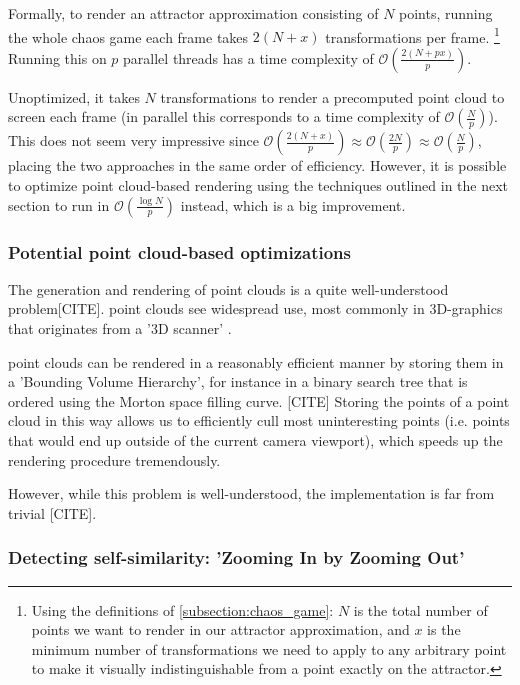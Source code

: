 \documentclass[11pt]{article}
\begin{document}
Formally, to render an attractor approximation consisting of \(N\) points, 
running the whole chaos game each frame takes \(2(N+x)\) transformations per frame. \footnote{Using the definitions of \autoref{subsection:chaos_game}: \(N\) is the total number of points we want to render in our attractor approximation, 
and \(x\) is the minimum number of transformations we need to apply to any arbitrary point to make it visually indistinguishable from a point exactly on the attractor.} 
Running this on \(p\) parallel threads has a time complexity of \(\mathcal{O}(\frac{2(N+px)}{p})\).

Unoptimized, it takes \(N\) transformations to render a precomputed point cloud to screen each frame (in parallel this corresponds to a time complexity of \(\mathcal{O}(\frac{N}{p})\)).
This does not seem very impressive since \(\mathcal{O}(\frac{2(N+x)}{p}) \approx \mathcal{O}(\frac{2N}{p}) \approx \mathcal{O}(\frac{N}{p})\),
placing the two approaches in the same order of efficiency. However, it is possible to optimize point cloud-based rendering using the techniques outlined in the next section
to run in \(\mathcal{O}(\frac{\log{N}}{p})\) instead, which is a big improvement.

\subsubsection{Potential point cloud-based optimizations}
\label{sec:org323a291}
\label{subsection:point_cloud_optimizations}

The generation and rendering of point clouds is a quite well-understood problem[CITE]. point clouds see widespread use,
most commonly in 3D-graphics that originates from a '3D scanner' .

point clouds can be rendered in a reasonably efficient manner by storing them in a 'Bounding Volume Hierarchy',
for instance in a binary search tree that is ordered using the Morton space filling curve. [CITE]
Storing the points of a point cloud in this way allows us to efficiently cull most uninteresting points (i.e. points that would end up outside of the current camera viewport),
which speeds up the rendering procedure tremendously.

However, while this problem is well-understood, the implementation is far from trivial [CITE].

\subsubsection{Detecting self-similarity: 'Zooming In by Zooming Out'}
\label{sec:orgee77b5d}
\label{subsection:self_similarity}
\end{document}
